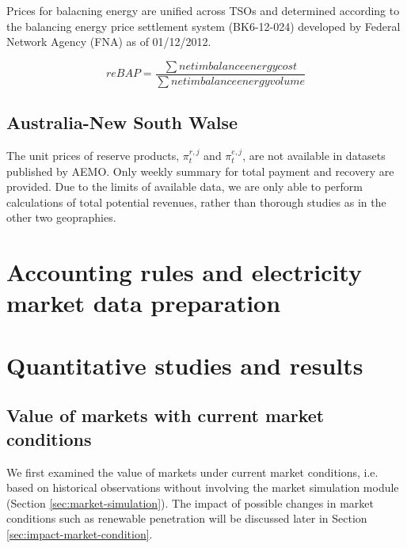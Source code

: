 

Prices for balacning energy are unified across TSOs and determined according to the  balancing energy price settlement system (BK6-12-024) developed by Federal Network Agency (FNA) as of 01/12/2012.

\begin{equation}
\label{eq:reBAP}
reBAP = \frac{\sum net imbalance energy cost}{\sum net imbalance energy volume}
\end{equation}

\subsection{Australia-New South Walse}
The unit prices of reserve products, $\pi_t^{r,j}$ and $\pi_t^{e,j}$, are not available in datasets published by AEMO. Only weekly summary for total payment and recovery are provided. Due to the limits of available data, we are only able to perform calculations of total potential revenues, rather than thorough studies as in the other two geopraphies.

\section{Accounting rules and electricity market data preparation}
\label{sec:accounting-data-prepare}
\newpage

\section{Quantitative studies and results}

\subsection{Value of markets with current market conditions}
We first examined the value of markets under current market conditions, i.e. based on historical observations without involving the market simulation module (Section \ref{sec:market-simulation}). The impact of possible changes in market conditions such as renewable penetration will be discussed later in Section \ref{sec:impact-market-condition}.

